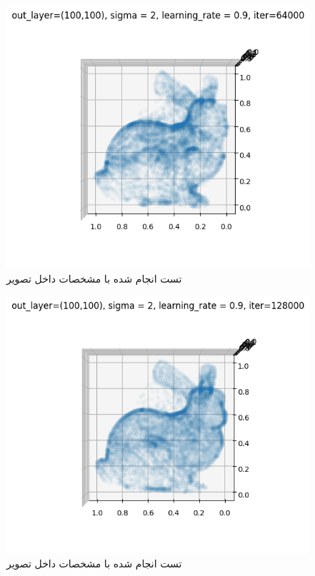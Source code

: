\documentclass{article}
\begin{document}
\begin{figure}[!h]
    \centering\includegraphics[scale=.65]{./p1-8}
    \caption{تست انجام شده با مشخصات داخل تصویر}\label{fig.18}
\end{figure}

\begin{figure}[!h]
    \centering\includegraphics[scale=.65]{./p1-9}
    \caption{تست انجام شده با مشخصات داخل تصویر}\label{fig.19}
\end{figure}
\end{document}
